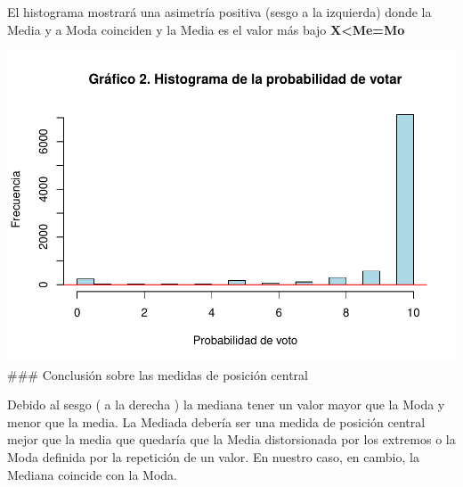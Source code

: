 \documentclass[
]{article}
\newenvironment{Shaded}{\begin{snugshade}}{\end{snugshade}}
\newcommand{\AttributeTok}[1]{\textcolor[rgb]{0.13,0.29,0.53}{#1}}
\newcommand{\CommentTok}[1]{\textcolor[rgb]{0.56,0.35,0.01}{\textit{#1}}}
\newcommand{\DecValTok}[1]{\textcolor[rgb]{0.00,0.00,0.81}{#1}}
\newcommand{\FunctionTok}[1]{\textcolor[rgb]{0.13,0.29,0.53}{\textbf{#1}}}
\newcommand{\NormalTok}[1]{#1}
\newcommand{\OtherTok}[1]{\textcolor[rgb]{0.56,0.35,0.01}{#1}}
\newcommand{\SpecialCharTok}[1]{\textcolor[rgb]{0.81,0.36,0.00}{\textbf{#1}}}
\newcommand{\StringTok}[1]{\textcolor[rgb]{0.31,0.60,0.02}{#1}}
\begin{document}
El histograma mostrará una asimetría positiva (sesgo a la izquierda)
donde la Media y a Moda coinciden y la Media es el valor más bajo
\textbf{X\textless Me=Mo}

\begin{Shaded}
\end{Shaded}

\includegraphics{probabilidadVoto_files/figure-latex/historiograma-1.pdf}
\#\#\# Conclusión sobre las medidas de posición central

Debido al sesgo ( a la derecha ) la mediana tener un valor mayor que la
Moda y menor que la media. La Mediada debería ser una medida de posición
central mejor que la media que quedaría que la Media distorsionada por
los extremos o la Moda definida por la repetición de un valor. En
nuestro caso, en cambio, la Mediana coincide con la Moda.
\end{document}
